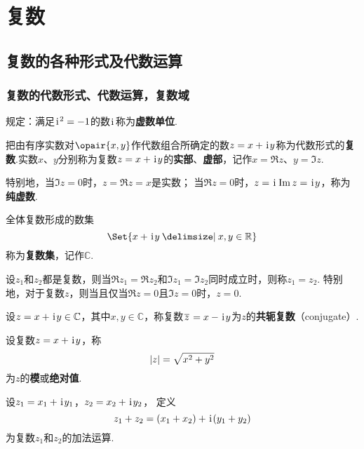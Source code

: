 \chapter{复数}
\section{复数的各种形式及代数运算}
\subsection{复数的代数形式、代数运算，复数域}
\begin{definition}[虚数单位]
规定：满足\(\kern1pt\mathrm{i}\kern1pt^2=-1\)的数\(\kern1pt\mathrm{i}\kern1pt\)称为\textbf{虚数单位}.
\end{definition}

\begin{definition}[复数的代数形式]
把由有序实数对\(\opair{x,y}\)作代数组合所确定的数\(z=x+\kern1pt\mathrm{i}\kern1pt y\)称为代数形式的\textbf{复数}.实数\(x\)、\(y\)分别称为复数\(z=x+\kern1pt\mathrm{i}\kern1pt y\)的\textbf{实部}、\textbf{虚部}，记作\(x=\Re z\)、\(y=\Im z\).

特别地，当\(\Im z=0\)时，\(z=\Re z=x\)是实数；
当\(\Re z=0\)时，\(z=\kern1pt\mathrm{i}\kern1pt\Im z=\kern1pt\mathrm{i}\kern1pt y\)，称为\textbf{纯虚数}.
\end{definition}

\begin{definition}
全体复数形成的数集\[
\Set{ x + \iu y \given x,y\in\mathbb{R} }
\]称为\textbf{复数集}，记作\(\mathbb{C}\).
\end{definition}

\begin{definition}[代数形式下复数相等条件]
设\(z_1\)和\(z_2\)都是复数，则当\(\Re z_1 = \Re z_2\)和\(\Im z_1 = \Im z_2\)同时成立时，则称\(z_1 = z_2\).
特别地，对于复数\(z\)，则当且仅当\(\Re z=0\)且\(\Im z=0\)时，\(z=0\).
\end{definition}

\begin{definition}[共轭复数]
设\(z=x + \kern1pt\mathrm{i}\kern1pt y \in\mathbb{C}\)，其中\(x,y\in\mathbb{C}\)，称复数\(\kern1pt\overline{z}\kern1pt=x - \kern1pt\mathrm{i}\kern1pt y\)为\(z\)的\textbf{共轭复数}（conjugate）.
\end{definition}

\begin{definition}[复数的模]
设复数\(z = x + \kern1pt\mathrm{i}\kern1pt y\)，称\[
\abs{z} = \sqrt{x^2 + y^2}
\]为\(z\)的\textbf{模}或\textbf{绝对值}.
\end{definition}

\begin{definition}[复数加法]
设\(z_1=x_1+\kern1pt\mathrm{i}\kern1pt y_1\)，\(z_2=x_2+\kern1pt\mathrm{i}\kern1pt y_2\)，%
定义\[
z_1+z_2=(x_1+x_2)+\kern1pt\mathrm{i}\kern1pt(y_1+y_2)
\]为复数\(z_1\)和\(z_2\)的加法运算.
\end{definition}

